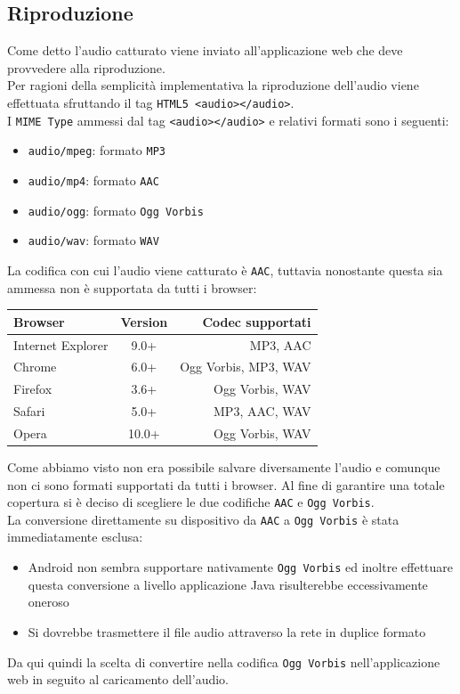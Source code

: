 \subsection{Riproduzione}
Come detto l'audio catturato viene inviato all'applicazione web che deve provvedere alla riproduzione.\\
Per ragioni della semplicità implementativa la riproduzione dell'audio viene effettuata sfruttando il tag \texttt{HTML5 <audio></audio>}.\\
I \texttt{MIME Type} ammessi dal tag \texttt{<audio></audio>} e relativi formati sono i seguenti:

\begin{itemize}
	\item \texttt{audio/mpeg}: formato \texttt{MP3}
	\item \texttt{audio/mp4}: formato \texttt{AAC}
	\item \texttt{audio/ogg}: formato \texttt{Ogg Vorbis}
	\item \texttt{audio/wav}: formato \texttt{WAV}
\end{itemize}

La codifica con cui l'audio viene catturato è \texttt{AAC}, tuttavia nonostante questa sia ammessa non è supportata da tutti i browser:

\begin{center}
\begin{tabular}{ l c r }
\textbf{Browser} & \textbf{Version} & \textbf{Codec supportati} \\
\toprule
Internet Explorer &	9.0+ & MP3, AAC \\
\midrule
Chrome & 6.0+ & Ogg Vorbis, MP3, WAV \\
\midrule
Firefox & 3.6+ & Ogg Vorbis, WAV \\
\midrule
Safari & 5.0+ & MP3, AAC, WAV \\
\midrule
Opera & 10.0+ & Ogg Vorbis, WAV \\
\bottomrule
\end{tabular}
\end{center}

Come abbiamo visto non era possibile salvare diversamente l'audio e comunque non ci sono formati supportati da tutti i browser. Al fine di garantire una totale copertura si è deciso di scegliere le due codifiche \texttt{AAC} e \texttt{Ogg Vorbis}.\\

La conversione direttamente su dispositivo da \texttt{AAC} a \texttt{Ogg Vorbis} è stata immediatamente esclusa:
\begin{itemize}
	\item Android non sembra supportare nativamente \texttt{Ogg Vorbis} ed inoltre effettuare questa conversione a livello applicazione Java risulterebbe eccessivamente oneroso
	\item Si dovrebbe trasmettere il file audio attraverso la rete in duplice formato
\end{itemize}
Da qui quindi la scelta di convertire nella codifica \texttt{Ogg Vorbis} nell'applicazione web in seguito al caricamento dell'audio.\\

